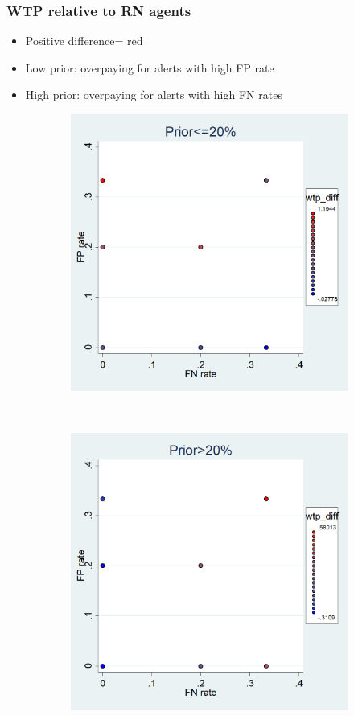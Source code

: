 \documentclass[11pt,hyperref={bookmarks=false}]{beamer}
\begin{document}
\begin{frame}
\frametitle{WTP relative to RN agents}
\begin{itemize}
\item Positive difference= red
\item Low prior: overpaying for alerts with high FP rate
\item High prior: overpaying for alerts with high FN rates
\end{itemize}
\begin{figure}[h]
\begin{subfigure}{0.5\textwidth}
\includegraphics[width=\textwidth]{Graphs/WTP_pattern_low.png}
\end{subfigure}
~
\begin{subfigure}{0.5\textwidth}
\includegraphics[width=\textwidth]{Graphs/WTP_pattern_high.png}

\end{subfigure}
\end{figure}
\end{frame}
\end{document}
